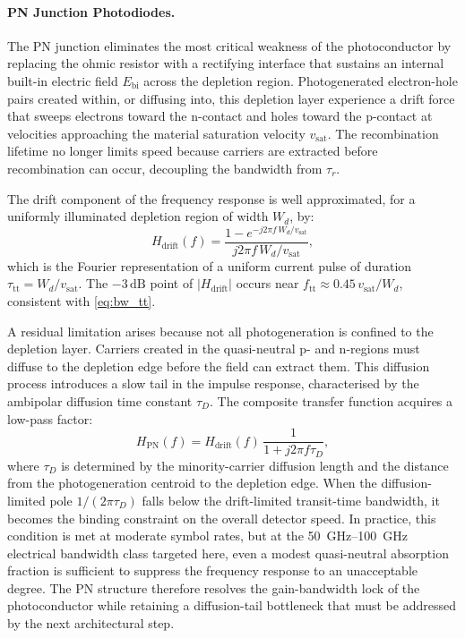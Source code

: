\paragraph{PN Junction Photodiodes.}
The PN junction eliminates the most critical weakness of the photoconductor
by replacing the ohmic resistor with a rectifying interface that sustains
an internal built-in electric field $E_{\mathrm{bi}}$ across the depletion
region. Photogenerated electron-hole pairs created within, or diffusing into,
this depletion layer experience a drift force that sweeps electrons toward
the n-contact and holes toward the p-contact at velocities approaching the
material saturation velocity $v_{\mathrm{sat}}$. The recombination lifetime
no longer limits speed because carriers are extracted before recombination can
occur, decoupling the bandwidth from $\tau_r$.

The drift component of the frequency response is well approximated, for a
uniformly illuminated depletion region of width $W_d$, by:
\begin{equation}
    H_{\mathrm{drift}}(f) =
    \frac{1 - e^{-j2\pi f\,W_d/v_{\mathrm{sat}}}}{j2\pi f\,W_d/v_{\mathrm{sat}}},
    \label{eq:hdrift}
\end{equation}
which is the Fourier representation of a uniform current pulse of duration
$\tau_{\mathrm{tt}} = W_d/v_{\mathrm{sat}}$. The $-3\,\mathrm{dB}$ point of
$|H_{\mathrm{drift}}|$ occurs near $f_{\mathrm{tt}} \approx 0.45\,v_{\mathrm{sat}}/W_d$,
consistent with \cref{eq:bw_tt}.

A residual limitation arises because not all photogeneration is confined to the
depletion layer. Carriers created in the quasi-neutral p- and n-regions must
diffuse to the depletion edge before the field can extract them. This diffusion
process introduces a slow tail in the impulse response, characterised by the
ambipolar diffusion time constant $\tau_D$. The composite transfer function
acquires a low-pass factor:
\begin{equation}
    H_{\mathrm{PN}}(f) =
    H_{\mathrm{drift}}(f)\,
    \frac{1}{1+j2\pi f\tau_D},
    \label{eq:hpn}
\end{equation}
where $\tau_D$ is determined by the minority-carrier diffusion length and
the distance from the photogeneration centroid to the depletion edge. When
the diffusion-limited pole $1/(2\pi\tau_D)$ falls below the drift-limited
transit-time bandwidth, it becomes the binding constraint on the overall
detector speed. In practice, this condition is met at moderate symbol rates,
but at the \SIrange{50}{100}{\giga\hertz} electrical bandwidth class targeted
here, even a modest quasi-neutral absorption fraction is sufficient to suppress
the frequency response to an unacceptable degree. The PN structure therefore
resolves the gain-bandwidth lock of the photoconductor while retaining a
diffusion-tail bottleneck that must be addressed by the next architectural step.

